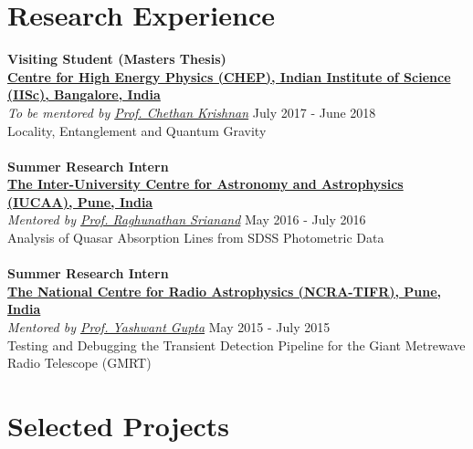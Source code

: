 \documentclass[margin, centered]{res}
\begin{document}
\begin{resume}
\section{Research Experience}
\textbf{Visiting Student (Masters Thesis)}
\\
\textbf{\href{http://chep.iisc.ac.in/}{Centre for High Energy Physics (CHEP), Indian Institute of Science (IISc), Bangalore, India}}\\
\emph{To be mentored by \href{http://chep.iisc.ac.in/Personnel/pages/chethan/index.html}{Prof. Chethan Krishnan}} \hfill July 2017 - June 2018\\
Locality, Entanglement and Quantum Gravity \\
\\
\textbf{Summer Research Intern}
\\
\textbf{\href{http://www.iucaa.ernet.in/}{The Inter-University Centre for Astronomy and Astrophysics (IUCAA), Pune, India}}
\\
\emph{Mentored by \href{http://www.iucaa.ernet.in/~anand/}{Prof. Raghunathan Srianand}} \hfill May 2016 - July 2016\\
Analysis of Quasar Absorption Lines from SDSS Photometric Data \\
\\
\textbf{Summer Research Intern}\\
\textbf{\href{http://www.ncra.tifr.res.in/}{The National Centre for Radio Astrophysics (NCRA-TIFR), Pune, India}}\\
\emph{Mentored by \href{http://www.ncra.tifr.res.in/ncra/people/academic/ncra-faculty/Yashwant_Gupta}{Prof. Yashwant Gupta}} \hfill May 2015 - July 2015\\
Testing and Debugging the Transient Detection Pipeline for the Giant Metrewave Radio Telescope (GMRT)

\section{Selected Projects}


\end{resume}
\end{document}
